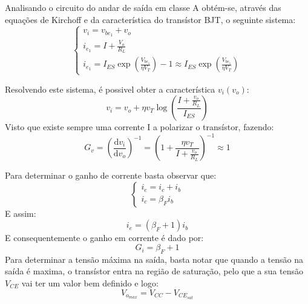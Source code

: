 \documentclass[%
  reprint,
  nofootinbib,
  amsmath,amssymb,
  aps,
  10pt,
  a4paper
]{revtex4-1}
\begin{document}
Analisando o circuito do andar de saída em classe A obtém-se, através das equações de Kirchoff e da característica do transístor BJT, o seguinte sistema:
\begin{equation}
\begin{cases} v_i=v_{{be}_1}+v_o \\ i_{e_1}=I+\frac{V_o}{R_L}\\i_{e_1}=I_{ES}\exp \left(\frac{V_{{be}_1}}{\eta V_T}\right)-1\approx I_{ES}\exp \left(\frac{V_{{be}_1}}{\eta V_T}\right)
 \end{cases} 
\end{equation}

Resolvendo este sistema, é possivel obter a característica $v_i(v_o)$:
\begin{equation}
v_i=v_o+\eta v_T\log \left(\frac{I+\frac{v_o}{R_L}}{I_{ES}}\right)
\end{equation}
Visto que existe sempre uma corrente I a polarizar o transístor, fazendo:
\begin{equation}
G_v=\left(\frac{\mathrm{d}v_i}{\mathrm{d}v_o}\right)^{-1}=\left(1+\frac{\eta v_T}{I+\frac{v_o}{R_L}}\right)^{-1}\approx 1
\label{eq:g_v}
\end{equation}

Para determinar o ganho de corrente basta observar que:
\begin{equation}
\begin{cases} i_e=i_c+i_b\\ i_c=\beta_F i_b
\end{cases}
\end{equation}
E assim:
\begin{equation}
i_e=(\beta_F+1)i_b
\end{equation}
E consequentemente o ganho em corrente é dado por:
\begin{equation}
G_i=\beta_F+1
\label{eq:g_i}
\end{equation}
Para determinar a tensão máxima na saída, basta notar que quando a tensão na saída é maxima, o transístor entra na região de saturação, pelo que a sua tensão $V_{CE}$ vai ter um valor bem definido e logo:
\begin{equation}
V_{o_{max}}=V_{CC}-V_{{CE}_{sat}}
\label{eq:sat}
\end{equation}
\end{document}
